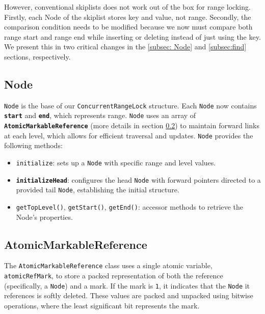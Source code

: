 However, conventional skiplists does not work out of the box for range locking. Firstly, each Node of the skiplist stores key and value, not range. Secondly, the comparison condition needs to be modified because we now must compare both range start and range end while inserting or deleting instead of just using the key. We present this in two critical changes in the \ref{subsec: Node} and \ref{subsec:find} sections, respectively.

\subsection{Node}\label{subsec:node}

\texttt{Node} is the base of our \texttt{ConcurrentRangeLock} structure.
Each \texttt{Node} now contains \textbf{\texttt{start}} and \textbf{\texttt{end}}, which represents range.
\texttt{Node} uses an array of \textbf{\texttt{AtomicMarkableReference}} (more details in section \ref{subsec:atomicmarkablereference}) to maintain forward links at each level, which allows for efficient traversal and updates. 
\texttt{Node} provides the following methods:

\begin{itemize}
    \item \texttt{initialize}: sets up a \texttt{Node} with specific range and level values.
    \item \textbf{\texttt{initializeHead}}: configures the head \texttt{Node} with forward pointers directed to a provided tail \texttt{Node}, establishing the initial structure.
    \item \texttt{getTopLevel()}, \texttt{getStart()}, \texttt{getEnd()}: accessor methods to retrieve the Node's properties.
\end{itemize}

\begin{figure}[h]
    \centering
    
\end{figure}

\clearpage

\subsection{AtomicMarkableReference} \label{subsec:atomicmarkablereference}

The \texttt{AtomicMarkableReference} class uses a single atomic variable, \texttt{atomicRefMark}, to store a packed representation of both the reference (specifically, a \texttt{Node}) and a mark. If the mark is \texttt{1}, it indicates that the \texttt{Node} it references is softly deleted. These values are packed and unpacked using bitwise operations, where the least significant bit represents the mark.

